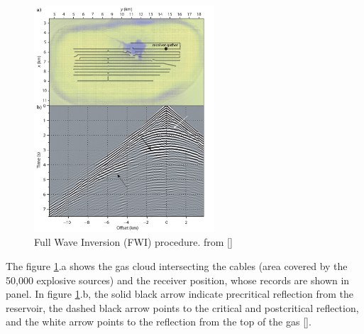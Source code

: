 \begin{figure}[!h]
\centering 
\includegraphics[width=0.6\textwidth]{images/sim1.png}
\caption{Full Wave Inversion (FWI) procedure. from []}
\label{sim1} 
\end{figure}
The figure \ref{sim1}.a shows the gas cloud intersecting the cables (area covered by the 50,000 explosive sources) and the receiver position, whose records are shown in panel. In figure \ref{sim1}.b, the solid black arrow indicate precritical reflection from the reservoir, the dashed black arrow points to the critical and postcritical reflection, and the white arrow points to the reflection from the top of the gas [].

